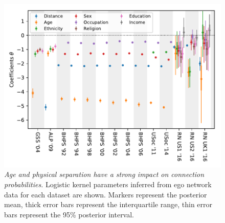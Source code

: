 \documentclass{scrartcl}
\newcommand{\titlecaption}[2]{\caption[#1]{\emph{#1} #2}}
\begin{document}
\begin{figure}
    \includegraphics{survey-coefficients}
    \titlecaption{Age and physical separation have a strong impact on connection probabilities.}{Logistic kernel parameters inferred from ego network data for each dataset are shown. Markers represent the posterior mean, thick error bars represent the interquartile range, thin error bars represent the 95\% posterior interval.\label{fig:survey-parameters}}
\end{figure}
\end{document}
